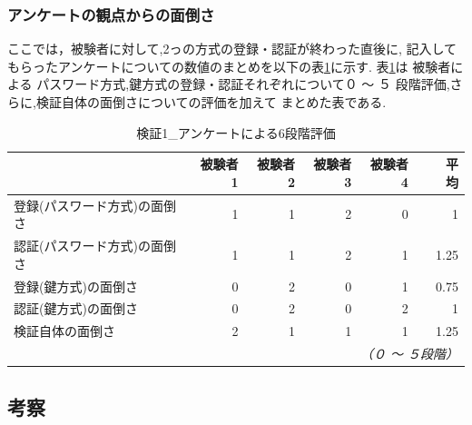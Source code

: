     \subsubsection{アンケートの観点からの面倒さ}
        ここでは，被験者に対して,2っの方式の登録・認証が終わった直後に,
        記入してもらったアンケートについての数値のまとめを以下の表\ref{検証１ アンケートによる６段階評価}に示す.
        表\ref{検証１ アンケートによる６段階評価}は 被験者による パスワード方式,鍵方式の登録・認証それぞれについて０ 〜 ５ 段階評価,さらに,検証自体の面倒さについての評価を加えて まとめた表である.
        \begin{table}[htb]
            \caption{検証1\_アンケートによる6段階評価}
            \label{検証１ アンケートによる６段階評価}
            \begin{tabular}{|l|r|r|r|r|r|} \hline%
                                        & 被験者1 & 被験者2 & 被験者3  & 被験者4 &　平均 \\ \hline%
                登録(パスワード方式)の面倒さ & 1 & 1 & 2 & 0 & 1 \\ \hline
                認証(パスワード方式)の面倒さ & 1 & 1 & 2 & 1 & 1.25 \\ \hline
                登録(鍵方式)の面倒さ       & 0 & 2 & 0 & 1 & 0.75 \\ \hline
                認証(鍵方式)の面倒さ       & 0 & 2 & 0 & 2 & 1 \\ \hline
                検証自体の面倒さ　      & 2 & 1 & 1 & 1 & 1.25 \\ \hline
    
                \multicolumn{6}{r}{\small\it （０ 〜 ５段階）}\\
            \end{tabular}
        \end{table}


 \subsection{考察}





\newpage





